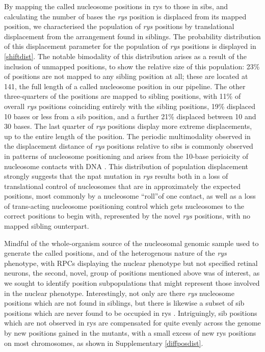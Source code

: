 By mapping the called nucleosome positions in rys to those in sibs, and calculating the number of bases the \textit{rys} position is displaced from its mapped position, we characterised the population of \textit{rys} positions by translational displacement from the arrangement found in siblings. The probability distribution of this displacement parameter for the population of \textit{rys} positions is displayed in \autoref{shiftdist}. The notable bimodality of this distribution arises as a result of the inclusion of unmapped positions, to show the relative size of this population: 23\% of positions are not mapped to any sibling position at all; these are located at 141, the full length of a called nucleosome position in our pipeline. The other three-quarters of the positions are mapped to sibling positions, with 11\% of overall \textit{rys} positions coinciding entirely with the sibling positions, 19\% displaced 10 bases or less from a sib position, and a further 21\% displaced between 10 and 30 bases. The last quarter of \textit{rys} positions display more extreme displacements, up to the entire length of the position. The periodic multimodality observed in the displacement distance of \textit{rys} positions relative to sibs is commonly observed in patterns of nucleosome positioning and arises from the 10-base perioicity of nucleosome contacts with DNA \cite{Wright2017}. This distribution of population displacement strongly suggests that the npat mutation in \textit{rys} results both in a loss of translational control of nucleosomes that are in approximately the expected positions, most commonly by a nucleosome ``roll''of one contact, as well as a loss of trans-acting nucleosome positioning control which gets nucleosomes to the correct positions to begin with, represented by the novel \textit{rys} positions, with no mapped sibling ounterpart.

Mindful of the whole-organism source of the nucleosomal genomic sample used to generate the called positions, and of the heterogenous nature of the \textit{rys} phenotype, with RPCs displaying the nuclear phenotype but not specified retinal neurons, the second, novel, group of positions mentioned above was of interest, as we sought to identify position subpopulations that might represent those involved in the nuclear phenotype. Interestingly, not only are there \textit{rys} nucleosome positions which are not found in siblings, but there is likewise a subset of sib positions which are never found to be occupied in rys . Intriguingly, sib positions which are not observed in rys are compensated for quite evenly across the genome by new positions gained in the mutants, with a small excess of new rys positions on most chromosomes, as shown in Supplementary \ref{diffposdist}.

